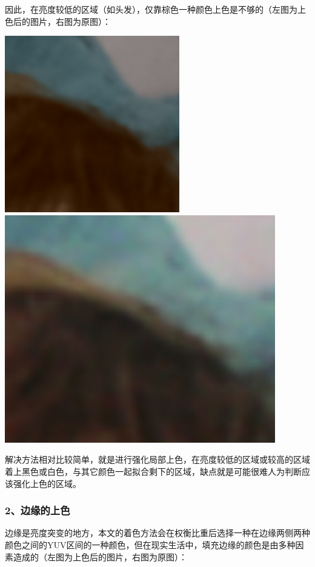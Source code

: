 \documentclass[12pt, a4paper, oneside]{report}
\begin{document}
	因此，在亮度较低的区域（如头发），仅靠棕色一种颜色上色是不够的（左图为上色后的图片，右图为原图）：
	
	\centerline{
		\includegraphics[scale=0.78]{hair1.png}
		\includegraphics[scale=0.6]{hair2.png}}
	
	解决方法相对比较简单，就是进行强化局部上色，在亮度较低的区域或较高的区域着上黑色或白色，与其它颜色一起拟合剩下的区域，缺点就是可能很难人为判断应该强化上色的区域。
	
	\subsubsection{2、边缘的上色}
	
	边缘是亮度突变的地方，本文的着色方法会在权衡比重后选择一种在边缘两侧两种颜色之间的YUV区间的一种颜色，但在现实生活中，填充边缘的颜色是由多种因素造成的（左图为上色后的图片，右图为原图）：
	
\end{document}
